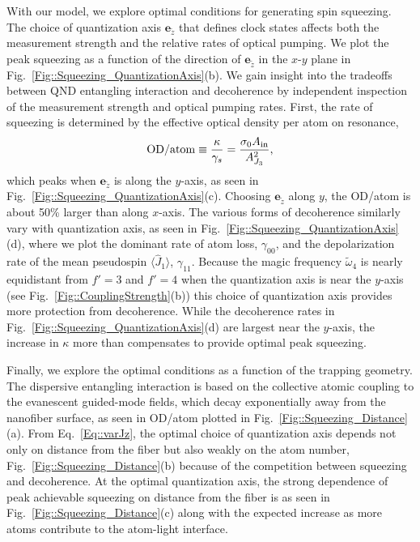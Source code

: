 \documentclass[preprint, aps,pra,onecolumn]{revtex4-1} %
\newcommand{\frf}[1]{Fig.~\ref{#1}}
\newcommand{\expt}[1]{\langle{#1}\rangle}
\newcommand{\jx}{\hat{J}_1}
\newcommand{\qaxis}{\mathbf{e}_{\tilde{z}}}
\newcommand{\magic}[1]{\tilde{\omega}_{#1}}
\begin{document}
With our model, we explore optimal conditions for generating spin squeezing.   The choice of quantization axis $\qaxis$ that defines clock states affects both the measurement strength and the relative rates of optical pumping. We plot the peak squeezing as a function of the direction of $\qaxis$ in the $x$-$y$ plane in \frf{Fig::Squeezing_QuantizationAxis}(b). 
We gain insight into the tradeoffs between QND entangling interaction and decoherence by independent inspection of the measurement strength and optical pumping rates.  
First, the rate of squeezing is determined by the effective optical density per atom on resonance,
\begin{align}\label{Eq::OD/atom}
\mathrm{OD}/\mathrm{atom} \equiv \frac{\kappa}{\gamma_s}=\frac{\sigma_0 A_{\rm in}}{A_{J_3}^2},
\end{align} 
which peaks when $\qaxis$ is along the $y$-axis, as seen in \frf{Fig::Squeezing_QuantizationAxis}(c). 
Choosing $\qaxis$ along $y$, the OD/atom is about 50\% larger than along $x$-axis.  
The various forms of decoherence similarly vary with quantization axis, as seen in \frf{Fig::Squeezing_QuantizationAxis}(d), where we plot the dominant rate of atom loss, $\gamma_{00}$, and the depolarization rate of the mean pseudospin $\expt{\jx}$, $\gamma_{11}$. 
Because the magic frequency $\magic{4}$ is nearly equidistant from $f'=3$ and $f'=4$ when the quantization  axis is near the $y$-axis (see \frf{Fig::CouplingStrength}(b)) this choice of quantization axis provides more protection from decoherence.   
While the decoherence rates in \frf{Fig::Squeezing_QuantizationAxis}(d) are largest near the $y$-axis, the increase in $\kappa$ more than compensates to provide optimal peak squeezing.

Finally, we explore the optimal conditions as a function of the trapping geometry.  
The dispersive entangling interaction is based on the collective atomic coupling to the evanescent guided-mode fields, which decay exponentially away from the nanofiber surface, as seen in OD/atom plotted in \frf{Fig::Squeezing_Distance}(a). 
From Eq.~\eqref{Eq::varJz}, the optimal choice of quantization axis depends not only on distance from the fiber but also weakly on the atom number, \frf{Fig::Squeezing_Distance}(b) because of the competition between squeezing and decoherence.  
At the optimal quantization axis, the strong dependence of peak achievable squeezing on distance from the fiber is as seen in \frf{Fig::Squeezing_Distance}(c) along with the expected increase as more atoms contribute to the atom-light interface.  
\end{document}
